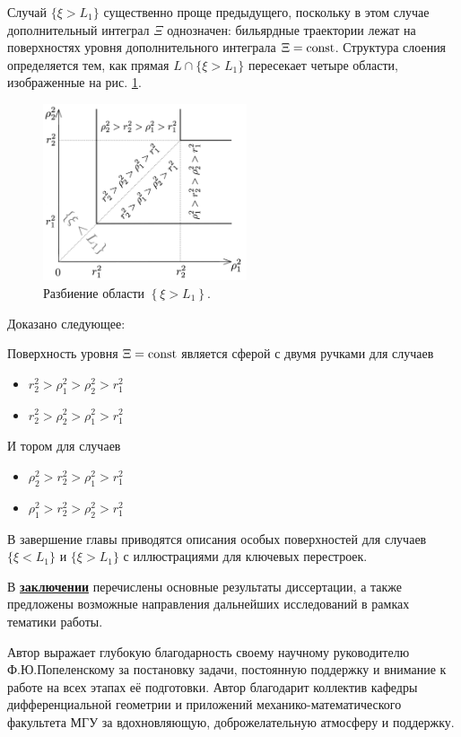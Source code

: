 Случай $\{\xi > L_1\}$ существенно проще предыдущего, поскольку в этом случае дополнительный интеграл $\Xi$ однозначен: бильярдные траектории лежат на поверхностях уровня дополнительного интеграла $\Xi=\mathrm{const}$.
Структура слоения определяется тем, как прямая $L \cap  \{\xi > L_1\}$ пересекает четыре области, изображенные на рис. \ref{fig:pt10:_xiL1_subdivision}.
\begin{figure}[!htb]
\centering
\includegraphics[width=6cm]{images/ch4/section3_circular/sect3_xiL1_subdivision.pdf}
    \caption{Разбиение области $\left\{\xi > L_1\right\}$.}
    \label{fig:pt10:_xiL1_subdivision}
\end{figure}
Доказано следующее:
\begin{theorem}
Поверхность уровня $\Xi = \mathrm{const}$ является сферой с двумя ручками для случаев
\begin{itemize}[beginpenalty=10000]
\item $r_2^2 > \rho_1^2 > \rho_2^2 > r_1^2$
\item $r_2^2 > \rho_2^2 > \rho_1^2 > r_1^2$
\end{itemize}
И тором для случаев 
\begin{itemize}[beginpenalty=10000]
\item $\rho_2^2 > r_2^2 > \rho_1^2 > r_1^2$
\item $\rho_1^2 > r_2^2 > \rho_2^2 > r_1^2$
\end{itemize}
\end{theorem}

В завершение главы приводятся описания особых поверхностей для случаев $\{\xi < L_1\}$ и $\{\xi > L_1\}$ с иллюстрациями для ключевых перестроек.

\FloatBarrier
{}                                  %
В \underline{\textbf{заключении}} перечислены основные результаты диссертации, а также предложены
возможные направления дальнейших исследований в рамках тематики работы.

{\gratitude}
Автор выражает глубокую благодарность своему научному руководителю Ф.Ю.Попеленскому за постановку задачи, постоянную поддержку и внимание к работе на всех этапах её подготовки. 
Автор благодарит коллектив кафедры дифференциальной геометрии и приложений механико-математического факультета МГУ за вдохновляющую, доброжелательную атмосферу и поддержку.